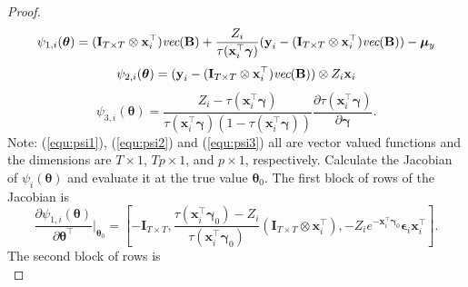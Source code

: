 \documentclass[12pt, A4]{article}
\newcommand{\SumOverN}{\sum_{i=1}^n}
\newcommand{\ObsRes}{\textbf{y}_i}
\newcommand{\ObsCov}{\textbf{x}_i}
\newcommand{\LogCoe}{\boldsymbol{\gamma}}
\newcommand{\vect}{\emph{vec}}
\newcommand{\IdenMat}{\textbf{I}}
\begin{document}
\begin{proof}
            \begin{equation}\label{equ:psi1}
                \psi_{1,i}(\boldsymbol{\theta}) = (\IdenMat_{T \times T} \otimes \ObsCov^{\top})\vect(\textbf{B}) + \frac{Z_i}{\tau(\ObsCov^{\top}\LogCoe)}(\textbf{y}_i - (\IdenMat_{T \times T} \otimes \ObsCov^{\top})\vect(\textbf{B})) - \boldsymbol{\mu}_{y}
            \end{equation}    
            \begin{equation}\label{equ:psi2}
                \psi_{2,i}(\boldsymbol{\theta}) = (\ObsRes - (\IdenMat_{T \times T} \otimes \ObsCov^{\top})\vect(\textbf{B})) \otimes Z_i \ObsCov
            \end{equation}    
            \begin{equation}\label{equ:psi3}
                \psi_{3,i}(\boldsymbol{\theta}) = \frac{Z_i - \tau(\ObsCov^{\top} \LogCoe)}{\tau(\ObsCov^{\top} \LogCoe)(1-\tau(\ObsCov^{\top} \LogCoe))} \frac{\partial \tau(\ObsCov^{\top} \LogCoe)}{ \partial \LogCoe}.
            \end{equation}
        Note: (\ref{equ:psi1}), (\ref{equ:psi2}) and (\ref{equ:psi3}) all are vector valued functions and the dimensions are $T \times 1$, $Tp \times 1$, and $p \times 1$, respectively.
        Calculate the Jacobian of $\psi_i(\boldsymbol{\theta})$ and evaluate it at the true value $\boldsymbol{\theta}_0$.
        The first block of rows of the Jacobian is
            \begin{equation*}
                \frac{\partial \psi_{1,i}(\boldsymbol{\theta})}{ \partial \boldsymbol{\theta}^{\top} } \biggr\rvert_{\boldsymbol{\theta}_0}  
                = \left[ - \IdenMat_{T \times T}, \frac{\tau(\ObsCov^{\top} \LogCoe_0)- Z_i}{\tau(\ObsCov^{\top} \LogCoe_0 )} (\IdenMat_{T \times T} \otimes \ObsCov^{\top}), -Z_i e^{-\ObsCov^{\top} \LogCoe_0} \boldsymbol{\epsilon}_i \ObsCov^{\top} \right].
            \end{equation*}        
        The second block of rows is
            \begin{equation*}

\end{equation*}
\end{proof}
\end{document}
